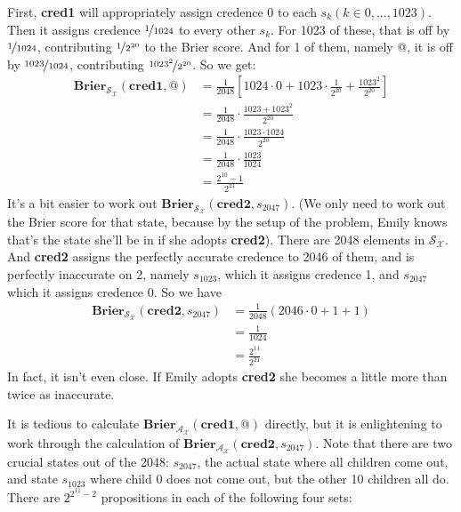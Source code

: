 First, \textbf{cred1} will appropriately assign credence 0 to each $s_k (k \in {0, ..., 1023})$. Then it assigns credence $\nicefrac{1}{1024}$ to every other $s_k$. For 1023 of these, that is off by $\nicefrac{1}{1024}$, contributing $\nicefrac{1}{2^{20}}$ to the Brier score. And for 1 of them, namely @, it is off by $\nicefrac{1023}{1024}$, contributing $\nicefrac{1023^2}{2^{20}}$. So we get:
\begin{align*}
\mathbf{Brier}_{\mathscr{S}_{\mathscr{X}}}(\mathbf{cred1}, @) &= \frac{1}{2048} [1024 \cdot 0 + 1023 \cdot \frac{1}{2^{20}} + \frac{1023^2}{2^{20}}] \\
&= \frac{1}{2048} \cdot \frac{1023 + 1023 ^2}{2^{20}} \\
&= \frac{1}{2048} \cdot \frac{1023 \cdot 1024}{2^{20}} \\
&= \frac{1}{2048} \cdot \frac{1023}{1024} \\
&= \frac{2^{10}-1}{2^{21}}
\end{align*}
It's a bit easier to work out $\mathbf{Brier}_{\mathscr{S}_{\mathscr{X}}}(\mathbf{cred2}, s_{2047})$. (We only need to work out the Brier score for that state, because by the setup of the problem, Emily knows that's the state she'll be in if she adopts \textbf{cred2}). There are 2048 elements in $\mathscr{S}_{\mathscr{X}}$. And \textbf{cred2} assigns the perfectly accurate credence to 2046 of them, and is perfectly inaccurate on 2, namely $s_{1023}$, which it assigns credence 1, and $s_{2047}$ which it assigns credence 0. So we have
\begin{align*}
\mathbf{Brier}_{\mathscr{S}_{\mathscr{X}}}(\mathbf{cred2}, s_{2047}) &= \frac{1}{2048} (2046 \cdot 0 + 1 + 1) \\
&= \frac{1}{1024} \\
&= \frac{2^{11}}{2^{21}}
\end{align*}
In fact, it isn't even close. If Emily adopts \textbf{cred2} she becomes a little more than twice as inaccurate.

It is tedious to calculate $\mathbf{Brier}_{\mathscr{A}_{\mathscr{X}}}(\mathbf{cred1}, @)$ directly, but it is enlightening to work through the calculation of $\mathbf{Brier}_{\mathscr{A}_{\mathscr{X}}}(\mathbf{cred2}, s_{2047})$. Note that there are two crucial states out of the 2048: $s_{2047}$, the actual state where all children come out, and state $s_{1023}$ where child 0 does not come out, but the other 10 children all do. There are $2^{2^{11}-2}$ propositions in each of the following four sets:

